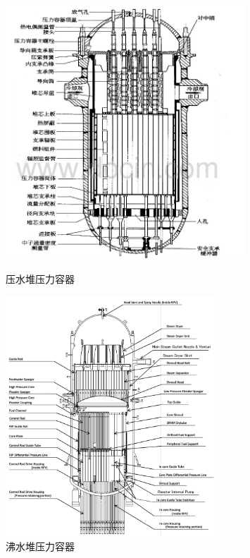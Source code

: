 \documentclass{article}
\begin{document}
\begin{figure}[htbp]
    \centering
    \begin{minipage}{0.45\textwidth}
        \centering
        \includegraphics[width=0.8\textwidth]{figures/PWR-reactor.png}
        \caption{压水堆压力容器}
        \label{fig:PWR-reactor}
    \end{minipage}
    \hfill
    \begin{minipage}{0.45\textwidth}
        \centering
        \includegraphics[width=0.7\textwidth]{figures/BWR-reactor.png}
        \caption{沸水堆压力容器}
        \label{fig:BWR-reactor}
    \end{minipage}
\end{figure}
\end{document}
